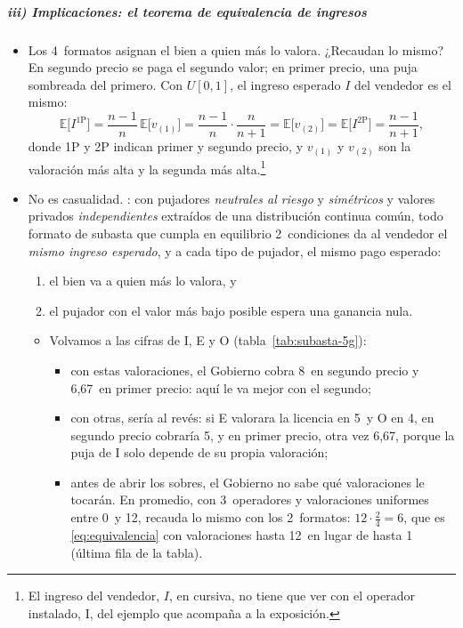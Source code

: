 \documentclass[11pt]{article}
\begin{document}
\subparagraph{iii) Implicaciones: el teorema de equivalencia de ingresos}

\begin{itemize}
\item Los 4~formatos asignan el bien a quien más lo valora. ¿Recaudan lo mismo? En segundo precio se paga el segundo valor; en primer precio, una puja sombreada del primero. Con $U[0,1]$, el ingreso esperado $I$ del vendedor es el mismo:
\begin{equation}\label{eq:equivalencia}
\mathbb{E}\big[I^{\mathrm{1P}}\big]=\frac{n-1}{n}\,\mathbb{E}\big[v_{(1)}\big]=\frac{n-1}{n}\cdot\frac{n}{n+1}=\mathbb{E}\big[v_{(2)}\big]=\mathbb{E}\big[I^{\mathrm{2P}}\big]=\frac{n-1}{n+1},
\end{equation}
  donde 1P y 2P indican primer y segundo precio, y $v_{(1)}$ y $v_{(2)}$ son la valoración más alta y la segunda más alta.\footnote{El ingreso del vendedor, $I$, en cursiva, no tiene que ver con el operador instalado, \textup{I}, del ejemplo que acompaña a la exposición.}
\item No es casualidad. \nocite{Vickrey1961Counterspeculation,Myerson1981Optimal,RileySamuelson1981Optimal}: con pujadores \emph{neutrales al riesgo} y \emph{simétricos} y valores privados \emph{independientes} extraídos de una distribución continua común, todo formato de subasta que cumpla en equilibrio 2~condiciones da al vendedor el \emph{mismo ingreso esperado}, y a cada tipo de pujador, el mismo pago esperado:
  \begin{enumerate}
  \item el bien va a quien más lo valora, y
  \item el pujador con el valor más bajo posible espera una ganancia nula.
  \end{enumerate}
  \begin{itemize}
  \item Volvamos a las cifras de \textup{I}, E y O (tabla~\ref{tab:subasta-5g}):
    \begin{itemize}
    \item con estas valoraciones, el Gobierno cobra 8~en segundo precio y 6,67~en primer precio: aquí le va mejor con el segundo;
    \item con otras, sería al revés: si E valorara la licencia en 5~y O en 4, en segundo precio cobraría 5, y en primer precio, otra vez 6,67, porque la puja de \textup{I} solo depende de su propia valoración;
    \item antes de abrir los sobres, el Gobierno no sabe qué valoraciones le tocarán. En promedio, con 3~operadores y valoraciones uniformes entre 0~y 12, recauda lo mismo con los 2~formatos: $12\cdot\frac{2}{4}=6$, que es \eqref{eq:equivalencia} con valoraciones hasta 12~en lugar de hasta 1 (última fila de la tabla).
    \end{itemize}
  \end{itemize}
\end{itemize}
\end{document}
